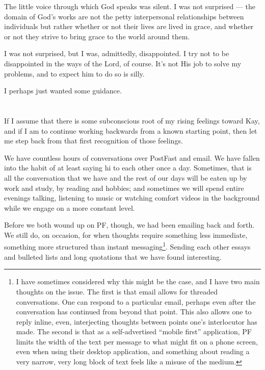 The little voice through which God speaks was silent. I was not surprised --- the domain of God's works are not the petty interpersonal relationships between individuals but rather whether or not their lives are lived in grace, and whether or not they strive to bring grace to the world around them.

I was not surprised, but I was, admittedly, disappointed. I try not to be disappointed in the ways of the Lord, of course. It's not His job to solve my problems, and to expect him to do so is silly.

I perhaps just wanted some guidance.

\section{}

If I assume that there is some subconscious root of my rising feelings toward Kay, and if I am to continue working backwards from a known starting point, then let me step back from that first recognition of those feelings.

We have countless hours of conversations over PostFast and email. We have fallen into the habit of at least saying hi to each other once a day. Sometimes, that is all the conversation that we have and the rest of our days will be eaten up by work and study, by reading and hobbies; and sometimes we will spend entire evenings talking, listening to music or watching comfort videos in the background while we engage on a more constant level.

Before we both wound up on PF, though, we had been emailing back and forth. We still do, on occasion, for when thoughts require something less immediate, something more structured than instant messaging\footnote{I have sometimes considered why this might be the case, and I have two main thoughts on the issue. The first is that email allows for threaded conversations. One can respond to a particular email, perhaps even after the conversation has continued from beyond that point. This also allows one to reply inline, even, interjecting thoughts between points one's interlocutor has made. The second is that as a self-advertised ``mobile first'' application, PF limits the width of the text per message to what might fit on a phone screen, even when using their desktop application, and something about reading a very narrow, very long block of text feels like a misuse of the medium.}. Sending each other essays and bulleted lists and long quotations that we have found interesting.

